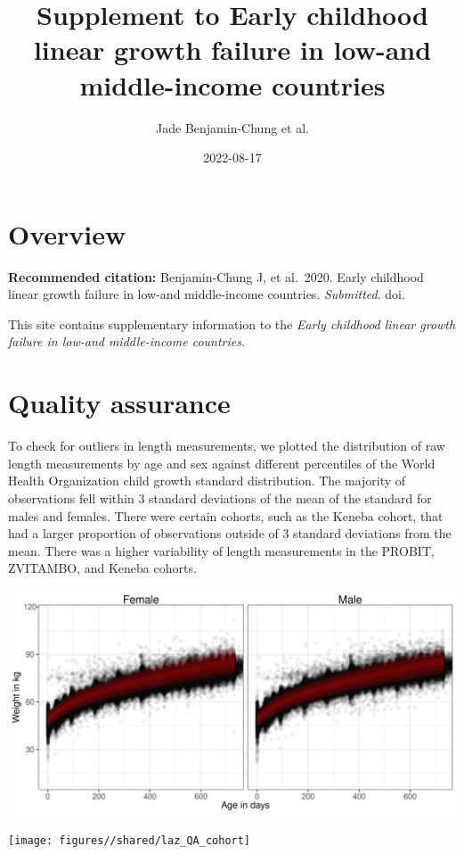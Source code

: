 \documentclass[
  9pt,
]{book}
\title{Supplement to Early childhood linear growth failure in low-and middle-income countries}
\author{Jade Benjamin-Chung et al.}
\date{2022-08-17}
\begin{document}
\maketitle

{
\setcounter{tocdepth}{1}
\tableofcontents
}
\hypertarget{overview}{%
\chapter{Overview}\label{overview}}

\textbf{Recommended citation:} Benjamin-Chung J, et al.~2020. Early childhood linear growth failure in low-and middle-income countries. \emph{Submitted}. doi.

This site contains supplementary information to the \emph{Early childhood linear growth failure in low-and middle-income countries}.

\hypertarget{QA}{%
\chapter{Quality assurance}\label{QA}}

\raggedright

To check for outliers in length measurements, we plotted the distribution of raw length measurements by age and sex against different percentiles of the World Health Organization child growth standard distribution. The majority of observations fell within 3 standard deviations of the mean of the standard for males and females. There were certain cohorts, such as the Keneba cohort, that had a larger proportion of observations outside of 3 standard deviations from the mean. There was a higher variability of length measurements in the PROBIT, ZVITAMBO, and Keneba cohorts.

\includegraphics[width=33.33in]{figures//shared/laz_QA}

\texttt{[image: figures//shared/laz\_QA\_cohort]}
\end{document}
